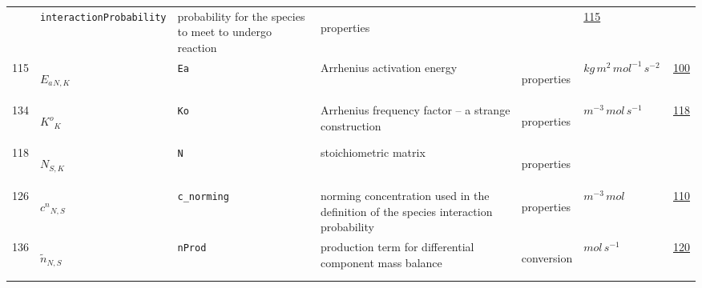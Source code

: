 \begin{longtable}{|p{1cm}|p{2.5cm}|p{4.5cm}|p{8cm}|p{3.0cm}|p{3cm}|p{1cm}|}
             & \verb|interactionProbability|
             & probability for the species to meet to undergo reaction
             & \begin{lay}properties \end{lay}
             & $  $
             &                 \hyperlink{"e:115"}{ 115 }
                 \\
            115
             & \hypertarget{"v:115"}{ $ {E_a}{_{N, K}} $}
             & \verb|Ea|
             & Arrhenius activation energy
             & \begin{lay}properties \end{lay}
             & $ kg \,m^{2} \,mol^{-1} \,s^{-2} \, $
             &                 \hyperlink{"e:100"}{ 100 }
                 \\
            134
             & \hypertarget{"v:134"}{ $ {{K^o}}{_{K}} $}
             & \verb|Ko|
             & Arrhenius frequency factor -- a strange construction
             & \begin{lay}properties \end{lay}
             & $ m^{-3} \,mol \,s^{-1} \, $
             &                 \hyperlink{"e:118"}{ 118 }
                 \\
            118
             & \hypertarget{"v:118"}{ $ {N}{_{S, K}} $}
             & \verb|N|
             & stoichiometric matrix
             & \begin{lay}properties \end{lay}
             & $  $
             & \\
            126
             & \hypertarget{"v:126"}{ $ {c^n}{_{N, S}} $}
             & \verb|c_norming|
             & norming concentration used in the definition of the species interaction probability
             & \begin{lay}properties \end{lay}
             & $ m^{-3} \,mol \, $
             &                 \hyperlink{"e:110"}{ 110 }
                 \\
            136
             & \hypertarget{"v:136"}{ $ {{\tilde{n}}}{_{N, S}} $}
             & \verb|nProd|
             & production term for differential component mass balance
             & \begin{lay}conversion \end{lay}
             & $ mol \,s^{-1} \, $
             &                 \hyperlink{"e:120"}{ 120 }
                 \\
    \end{longtable}
